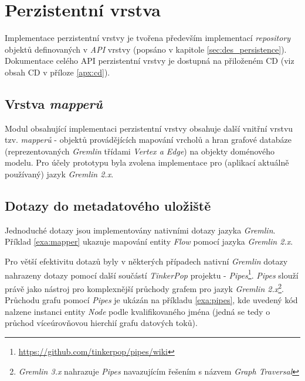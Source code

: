 

\section{Perzistentní vrstva}
Implementace perzistentní vrstvy je tvořena především implementací \textit{repository} objektů definovaných v \textit{API} vrstvy (popsáno v kapitole \ref{sec:des_persistence}). Dokumentace celého API perzistentní vrstvy je dostupná na přiloženém CD (viz obsah CD v příloze \ref{apx:cd}).

\subsection{Vrstva \textit{mapperů}}
Modul obsahující implementaci perzistentní vrstvy obsahuje další vnitřní vrstvu tzv. \textit{mapperů} - objektů provádějících mapování vrcholů a hran grafové databáze (reprezentovaných \textit{Gremlin} třídami \textit{Vertex a Edge}) na objekty doménového modelu.  Pro účely prototypu byla zvolena implementace pro (aplikací aktuálně používaný) jazyk \textit{Gremlin 2.x}.

\subsection{Dotazy do metadatového uložiště}
Jednoduché dotazy jsou implementovány nativními dotazy jazyka \textit{Gremlin}. Příklad \ref{exa:mapper} ukazuje mapování entity \textit{Flow} pomocí jazyka \textit{Gremlin 2.x}.



Pro větší efektivitu dotazů byly v některých případech nativní \textit{Gremlin} dotazy nahrazeny dotazy pomocí další součástí \textit{TinkerPop} projektu - \textit{Pipes}\footnote{\url{https://github.com/tinkerpop/pipes/wiki}}. \textit{Pipes} slouží právě jako nástroj pro komplexnější průchody grafem pro jazyk \textit{Gremlin 2.x}\footnote{\textit{Gremlin 3.x} nahrazuje \textit{Pipes} navazujícím řešením s názvem \textit{Graph Traversal}}. Průchodu grafu pomocí \textit{Pipes} je ukázán na příkladu \ref{exa:pipes}, kde uvedený kód nalzene instanci entity \textit{Node} podle kvalifikovaného jména (jedná se tedy o průchod víceúrovňovou hierchií grafu datových toků).



